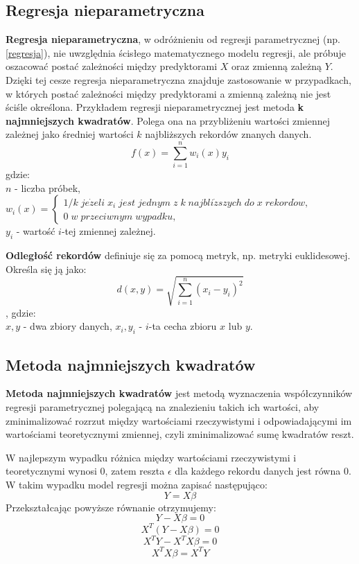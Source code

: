\subsection{Regresja nieparametryczna}
\textbf{Regresja nieparametryczna}, w odróżnieniu od regresji parametrycznej (np. \ref{regresja}), nie uwzględnia ścisłego matematycznego modelu regresji, ale próbuje oszacować postać zależności między predyktorami \(X\) oraz zmienną zależną \(Y\). Dzięki tej cesze regresja nieparametryczna znajduje zastosowanie w przypadkach, w których postać zależności między predyktorami a zmienną zależną nie jest ściśle określona.\cite{nonparametricregression}
Przykładem regresji nieparametrycznej jest metoda \textbf{k najmniejszych kwadratów}. Polega ona na przybliżeniu wartości zmiennej zależnej jako średniej wartości \(k\) najbliższych rekordów znanych danych.
\[f(x)=\sum_{i = 1}^{n}w_i(x)y_i \]
gdzie:\\
\(n\) - liczba próbek,\\[10pt]
\(w_i(x) = \left\{\begin{array}{ll}
1/k\;je\dot{z}eli\;x_i\;jest\;jednym\;z\;k\;najbli\dot{z}szych\;do\;x\;rekord\dot{o}w,\\
0\;w\;przeciwnym\;wypadku,
\end{array}
\right. \)\\[10pt]
\(y_i\) - wartość \(i\)-tej zmiennej zależnej.\cite{ryantibshirani}

\textbf{Odległość rekordów} definiuje się za pomocą metryk, np. metryki euklidesowej. Określa się ją jako:
\[d(x,y)=\sqrt{\sum_{i=1}^{n}(x_i-y_i)^2} \],
gdzie:\\
\(x, y\) - dwa zbiory danych,
\(x_i, y_i\) - \(i\)-ta cecha zbioru \(x\) lub \(y\).\\
\subsection{Metoda najmniejszych kwadratów}\label{najmniejsze_kwadraty}
\textbf{Metoda najmniejszych kwadratów} jest metodą wyznaczenia współczynników regresji parametrycznej polegającą na znalezieniu takich ich wartości, aby zminimalizować rozrzut między wartościami rzeczywistymi i odpowiadającymi im wartościami teoretycznymi zmiennej, czyli zminimalizować sumę kwadratów reszt.\cite{bptstatystyka}

W najlepszym wypadku różnica między wartościami rzeczywistymi i teoretycznymi wynosi 0, zatem reszta \(\epsilon\) dla każdego rekordu danych jest równa 0. W takim wypadku model regresji można zapisać następująco: 
\[Y = X\beta\]
Przekształcając powyższe równanie otrzymujemy:
\[Y - X\beta = 0\]
\[X^T(Y - X\beta) = 0 \]
\[X^TY - X^TX\beta = 0 \]
\[X^TX\beta = X^TY\]

